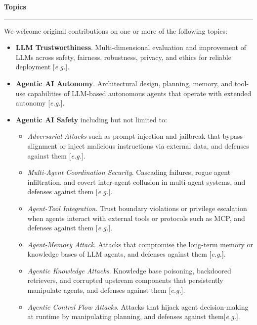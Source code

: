 \documentclass{article}
\newcommand{\eg}{\textit{e.g.}}
\newcommand{\sectiontitle}[1]{\noindent\textbf{\textcolor{neuripsblue}{#1}}\vspace{0.1cm}\hrule\vspace{0.2cm}}
\begin{document}
\sectiontitle{Topics}
\vspace{-2pt}
We welcome original contributions on one or more of the following topics:
\begin{itemize}[leftmargin=10pt,itemsep=1pt,topsep=2pt]
\item \textbf{LLM Trustworthiness}. Multi-dimensional evaluation and improvement of LLMs across safety, fairness, robustness, privacy, and ethics for reliable deployment [\eg \cite{wang2023decodingtrust, huang2024trustllm, wei2023jailbroken}].

\item \textbf{Agentic AI Autonomy}. Architectural design, planning, memory, and tool-use capabilities of LLM-based autonomous agents that operate with extended autonomy [\eg \cite{yao2023react, zhou2024webarena, yang2024sweagent}].

\item \textbf{Agentic AI Safety} including but not limited to:
\begin{itemize}[itemsep=1pt,topsep=0pt]
\item \textit{Adversarial Attacks} such as prompt injection and jailbreak that bypass alignment or inject malicious instructions via external data, and defenses against them [\eg \cite{zou2023universal, liu2024autodan, chen2025struq}].

\item \textit{Multi-Agent Coordination Security}.  Cascading failures, rogue agent infiltration, and covert inter-agent collusion in multi-agent systems, and defenses against them [\eg \cite{gu2024agentsmith}].

\item \textit{Agent-Tool Integration}. Trust boundary violations  or privilege escalation when agents interact with external tools or protocols such as MCP, and defenses against them [\eg \cite{wu2025isolategpt}].

\item \textit{Agent-Memory Attack}. Attacks that compromise the long-term memory or knowledge bases of LLM agents, and defenses against them  [\eg \cite{chen2024agentpoison}].

\item \textit{Agentic Knowledge Attacks}. Knowledge base poisoning, backdoored retrievers, and corrupted upstream components that persistently manipulate agents, and defenses against them [\eg \cite{zou2025poisonedrag}].


\item \textit{Agentic Control Flow Attacks}. Attacks that hijack agent decision-making at runtime by manipulating planning, and defenses against them[\eg \cite{zhang2025asb, xu2026storage}].


\end{itemize}
\end{itemize}
\end{document}
